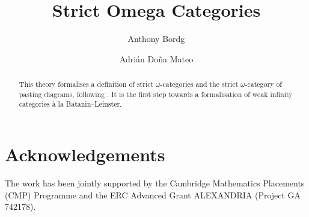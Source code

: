 \documentclass[11pt,a4paper]{article}
\begin{document}
\title{Strict Omega Categories}
\author{Anthony Bordg \and Adrián Doña Mateo}
\maketitle

\begin{abstract}
  This theory formalises a definition of strict $\omega$-categories and the strict $\omega$-category
  of pasting diagrams, following \cite{Leinster2004}. It is the first step towards a formalisation
  of weak infinity categories à la Batanin--Leinster.
\end{abstract}

\tableofcontents



\section{Acknowledgements}

The work has been jointly supported by the Cambridge Mathematics Placements (CMP) 
Programme and the ERC Advanced Grant ALEXANDRIA (Project GA 742178).



\end{document}
